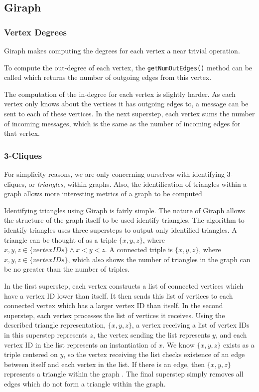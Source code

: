 \subsection{Giraph}

\subsubsection{Vertex Degrees}
Giraph makes computing the degrees for each vertex a near trivial operation.

To compute the out-degree of each vertex, the \verb/getNumOutEdges()/ method can be called which returns the number of outgoing edges from this vertex.

The computation of the in-degree for each vertex is slightly harder. As each vertex only knows about the vertices it has outgoing edges to, a message can be sent to each of these vertices. In the next superstep, each vertex sums the number of incoming messages, which is the same as the number of incoming edges for that vertex.

\subsubsection{3-Cliques}
For simplicity reasons, we are only concerning ourselves with identifying 3-cliques, or \emph{triangles}, within graphs. Also, the identification of triangles within a graph allows more interesting metrics of a graph to be computed

Identifying triangles using Giraph is fairly simple. The nature of Giraph allows the structure of the graph itself to be used identify triangles. The algorithm to identify triangles uses three supersteps to output only identified triangles. A triangle can be thought of as a triple $\{x, y, z\}$, where $x, y, z \in \{vertex IDs\} \land x < y < z$. A connected triple is $\{x, y, z\}$, where $x, y, z \in \{vertex IDs\}$, which also shows the number of triangles in the graph can be no greater than the number of triples.

In the first superstep, each vertex constructs a list of connected vertices which have a vertex ID lower than itself. It then sends this list of vertices to each connected vertex which has a larger vertex ID than itself. In the second superstep, each vertex processes the list of vertices it receives. Using the described triangle representation, $\{x, y, z\}$, a vertex receiving a list of vertex IDs in this superstep represents $z$, the vertex sending the list represents $y$, and each vertex ID in the list represents an instantiation of $x$. We know $\{x, y, z\}$ exists as a triple centered on $y$, so the vertex receiving the list checks existence of an edge between itself and each vertex in the list. If there is an edge, then $\{x, y, z\}$ represents a triangle within the graph \cite{cetindil11}. The final superstep simply removes all edges which do not form a triangle within the graph.

